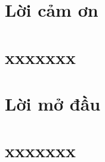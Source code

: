 \documentclass{article}
\begin{document}
% 

% 


\section{ Lời cảm ơn}






\section{xxxxxxx}




\section{Lời mở đầu}


\section{xxxxxxx}
 









\end{document}
